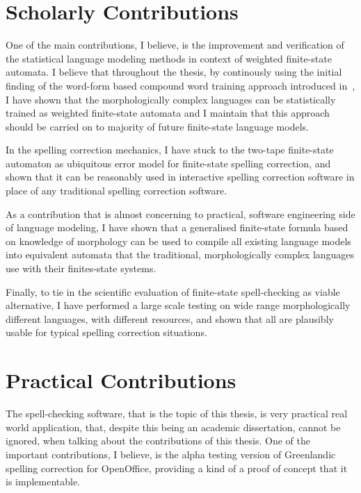 \documentclass[officiallayout]{unihelcompling}
\begin{document}
\section{Scholarly Contributions}
\label{sec:scholarly-contributions}

One of the main contributions, I believe, is the improvement and verification
of the statistical language modeling methods in context of weighted 
finite-state automata. I believe that throughout the thesis, by continously
using the initial finding of the word-form based compound word training
approach introduced in~\citep{pirinen2009weighted}, I have shown that the
morphologically complex languages can be statistically trained as weighted
finite-state automata and I maintain that this approach should be carried on
to majority of future finite-state language models.

In the spelling correction mechanics, I have stuck to the two-tape finite-state
automaton as ubiquitous error model for finite-state spelling correction, and
shown that it can be reasonably used in interactive spelling correction
software in place of any traditional spelling correction software.

As a contribution that is almost concerning to practical, software engineering
side of language modeling, I have shown that a generalised finite-state formula
based on knowledge of morphology can be used to compile all existing language
models into equivalent automata that the traditional, morphologically complex
languages use with their finites-state systems.

Finally, to tie in the scientific evaluation of finite-state spell-checking as
viable alternative, I have performed a large scale testing on wide range
morphologically different languages, with different resources, and shown that
all are plausibly usable for typical spelling correction situations.


\section{Practical Contributions}
\label{sec:practical-contributions}

The spell-checking software, that is the topic of this thesis, is very
practical real world application, that, despite this being an academic
dissertation, cannot be ignored, when talking about the contributions of this
thesis. One of the important contributions, I believe, is the alpha testing
version of Greenlandic spelling correction for OpenOffice, providing a kind of
a proof of concept that it is implementable.
\end{document}
